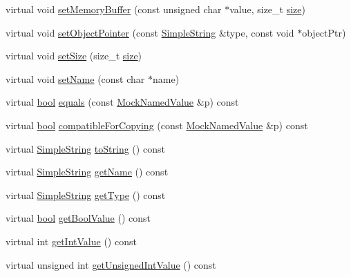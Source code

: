 \begin{DoxyCompactItemize}
\item 
virtual void \hyperlink{class_mock_named_value_aa64f3137427c5e0eadf4eac48fa12929}{set\+Memory\+Buffer} (const unsigned char $\ast$value, size\+\_\+t \hyperlink{gst__avb__playbin_8c_a439227feff9d7f55384e8780cfc2eb82}{size})
\item 
virtual void \hyperlink{class_mock_named_value_afb0af4eeafa2323ab0de8212c46a50d7}{set\+Object\+Pointer} (const \hyperlink{class_simple_string}{Simple\+String} \&type, const void $\ast$object\+Ptr)
\item 
virtual void \hyperlink{class_mock_named_value_a97deb13018c1b55b18bfe25a9e339e8d}{set\+Size} (size\+\_\+t \hyperlink{gst__avb__playbin_8c_a439227feff9d7f55384e8780cfc2eb82}{size})
\item 
virtual void \hyperlink{class_mock_named_value_ab3a256e7d9fad73fa57de7c1fedf51c5}{set\+Name} (const char $\ast$name)
\item 
virtual \hyperlink{avb__gptp_8h_af6a258d8f3ee5206d682d799316314b1}{bool} \hyperlink{class_mock_named_value_ae9e3bc5a05d1a0a62f2227d38135cc6a}{equals} (const \hyperlink{class_mock_named_value}{Mock\+Named\+Value} \&p) const 
\item 
virtual \hyperlink{avb__gptp_8h_af6a258d8f3ee5206d682d799316314b1}{bool} \hyperlink{class_mock_named_value_a8fba3c60ac4cf39df8227eb266a34370}{compatible\+For\+Copying} (const \hyperlink{class_mock_named_value}{Mock\+Named\+Value} \&p) const 
\item 
virtual \hyperlink{class_simple_string}{Simple\+String} \hyperlink{class_mock_named_value_af483ba199df3fea7a53d4f86f2ea0926}{to\+String} () const 
\item 
virtual \hyperlink{class_simple_string}{Simple\+String} \hyperlink{class_mock_named_value_ab9fb89f09ab681191e4eaa9221b42491}{get\+Name} () const 
\item 
virtual \hyperlink{class_simple_string}{Simple\+String} \hyperlink{class_mock_named_value_a149f9255153928a6fff62d1ff94d9dcf}{get\+Type} () const 
\item 
virtual \hyperlink{avb__gptp_8h_af6a258d8f3ee5206d682d799316314b1}{bool} \hyperlink{class_mock_named_value_a71b8fb9ffdc35fb1b08262c0a78dad38}{get\+Bool\+Value} () const 
\item 
virtual int \hyperlink{class_mock_named_value_abd16164fc39269075bdbbdae82fcc330}{get\+Int\+Value} () const 
\item 
virtual unsigned int \hyperlink{class_mock_named_value_aee5bfac973d1da4fec61c285d0808258}{get\+Unsigned\+Int\+Value} () const 
\item 

\end{DoxyCompactItemize}

